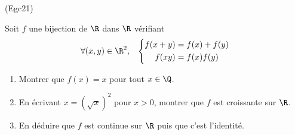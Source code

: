 \begin{tiny}(Egc21)\end{tiny} Soit $f$ une bijection de $\R$ dans $\R$ vérifiant
\begin{displaymath}
 \forall(x,y)\in \R^2,\hspace{0.3cm}
\left\lbrace 
\begin{aligned}
 f(x+y) &= f(x) + f(y)\\ f(xy) &= f(x) f(y)
\end{aligned}
\right. 
\end{displaymath}
\begin{enumerate}
 \item Montrer que $f(x) = x$ pour tout $x\in \Q$.
\item En écrivant $x = (\sqrt{x})^2$ pour $x>0$, montrer que $f$ est croissante sur $\R$.
\item En déduire que $f$ est continue sur $\R$ puis que c'est l'identité.
\end{enumerate}




 